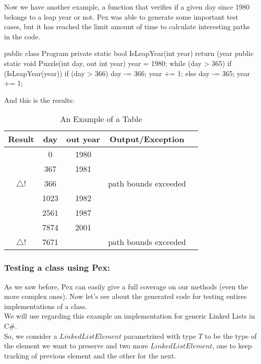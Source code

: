 \documentclass[10pt, conference, compsocconf]{IEEEtran}
\newcommand{\checkK}{\color{ForestGreen}\checkmark}
\newcommand{\bigexclaim}{\color{Dandelion}$\bigtriangleup$\hspace{-5.6pt}!}
\begin{document}
Now we have another example, a function that verifies if a given day since 1980 belongs to a leap year or not. Pex was able to generate
some important test cases, but it has reached the limit amount of time to calculate interesting paths in the code.

\begin{code}
public class Program {
  private static bool IsLeapYear(int year) {
    return (year %
  }
  public static void Puzzle(int day, out int year) {
    year = 1980;
    while (day > 365) {
      if (IsLeapYear(year)) {
        if (day > 366) {
          day -= 366;
          year += 1;
        }
      } else {
        day -= 365;
        year += 1;
      }
    }
  }
}
\end{code}

And this is the results:\\

\begin{table}[!h]
\renewcommand{\arraystretch}{1.3}
\caption{An Example of a Table}
\centering
\noindent \begin{tabular}{|c|c|c|c|c|}\hline
Result & day & out year & Output/Exception\\\hline
\checkK & 0 & 1980 & \\\hline
\checkK & 367 & 1981 & \\\hline
\bigexclaim & 366 & & path bounds exceeded\\\hline
\checkK & 1023 & 1982 &\\\hline
\checkK & 2561 & 1987 & \\\hline
\checkK & 7874 & 2001 & \\\hline
\bigexclaim &  7671 & & path bounds exceeded\\\hline
\end{tabular}
\end{table}

\subsubsection{Testing a class using Pex:}
As we saw before, Pex can easily give a full coverage on our methods (even the more complex ones). Now let's see about the generated code
for testing entires implementations of a class.\\
We will use regarding this example an implementation for generic Linked Lists in C\#.\\

So, we consider a $LinkedListElement$ parametrized with type $T$ to be the type of the element we want to preserve and two more $LinkedListElement$, one to keep
tracking of previous element and the other for the next.
\end{document}
